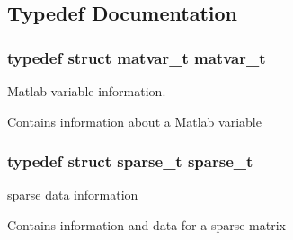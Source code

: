 \subsection{\-Typedef \-Documentation}
\hypertarget{group__MAT_ga24775c96a2a6d073581639c780b7896c}{
\subsubsection[{matvar\-\_\-t}]{\setlength{\rightskip}{0pt plus 5cm}typedef struct {\bf matvar\-\_\-t}  {\bf matvar\-\_\-t}}}\label{group__MAT_ga24775c96a2a6d073581639c780b7896c}


\-Matlab variable information. 

\-Contains information about a \-Matlab variable \hypertarget{group__MAT_ga3ce6ed53a1909e27e92f3eaffc2f92ed}{
\subsubsection[{sparse\-\_\-t}]{\setlength{\rightskip}{0pt plus 5cm}typedef struct {\bf sparse\-\_\-t}  {\bf sparse\-\_\-t}}}\label{group__MAT_ga3ce6ed53a1909e27e92f3eaffc2f92ed}


sparse data information 

\-Contains information and data for a sparse matrix 

